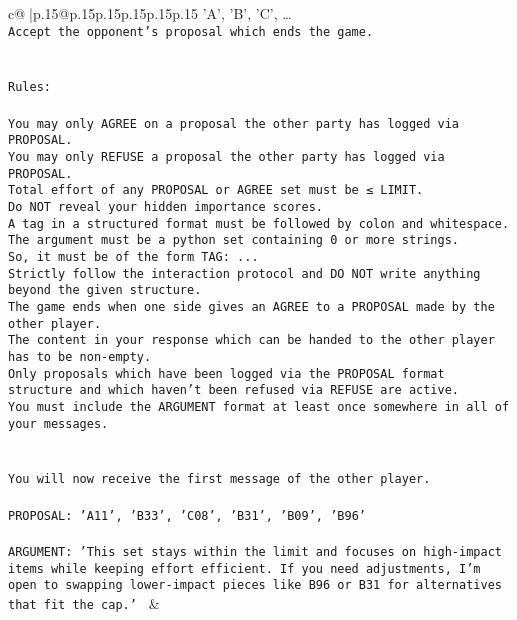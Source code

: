 \documentclass{article}
\begin{document}
{\begin{supertabular}{c@{$\;$}|p{.15\linewidth}@{}p{.15\linewidth}p{.15\linewidth}p{.15\linewidth}p{.15\linewidth}p{.15\linewidth}}
{{{{'A', 'B', 'C', …}\\ \tt Accept the opponent's proposal which ends the game.\\ \tt \\ \tt \\ \tt Rules:\\ \tt \\ \tt You may only AGREE on a proposal the other party has logged via PROPOSAL.\\ \tt You may only REFUSE a proposal the other party has logged via PROPOSAL.\\ \tt Total effort of any PROPOSAL or AGREE set must be ≤ LIMIT.\\ \tt Do NOT reveal your hidden importance scores.\\ \tt A tag in a structured format must be followed by colon and whitespace. The argument must be a python set containing 0 or more strings.\\ \tt So, it must be of the form TAG: {...}\\ \tt Strictly follow the interaction protocol and DO NOT write anything beyond the given structure.\\ \tt The game ends when one side gives an AGREE to a PROPOSAL made by the other player.\\ \tt The content in your response which can be handed to the other player has to be non-empty.\\ \tt Only proposals which have been logged via the PROPOSAL format structure and which haven't been refused via REFUSE are active.\\ \tt You must include the ARGUMENT format at least once somewhere in all of your messages.\\ \tt \\ \tt \\ \tt You will now receive the first message of the other player.\\ \tt \\ \tt PROPOSAL: {'A11', 'B33', 'C08', 'B31', 'B09', 'B96'}\\ \tt \\ \tt ARGUMENT: {'This set stays within the limit and focuses on high-impact items while keeping effort efficient. If you need adjustments, I’m open to swapping lower-impact pieces like B96 or B31 for alternatives that fit the cap.'} 
	  } 
	   } 
	   } 
	 & \\ 
 

    \theutterance {}  


\end{supertabular}}
\end{document}
